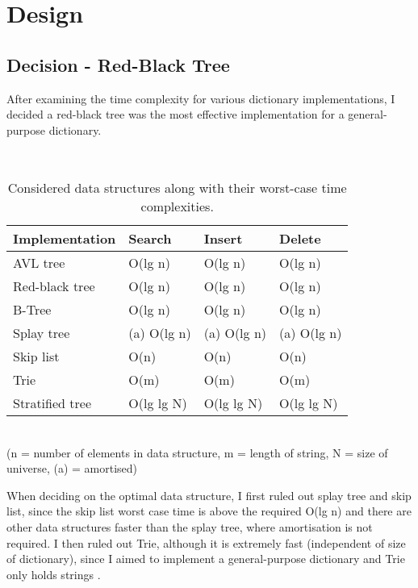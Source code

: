 \section{Design}

\subsection{Decision - Red-Black Tree}

After examining the time complexity for various dictionary implementations, I decided a red-black tree was the most effective implementation for a general-purpose dictionary.

\\

\begin{table}[hp]
\centering
\begin{tabular}{| l | l | l | l |}
\hline
\textbf{Implementation} & \textbf{Search} & \textbf{Insert} & \textbf{Delete} \\ \hline
AVL tree & O(lg n) & O(lg n) & O(lg n) \\ \hline
Red-black tree & O(lg n) & O(lg n) & O(lg n) \\ \hline
B-Tree & O(lg n) & O(lg n) & O(lg n) \\ \hline
Splay tree & (a) O(lg n) & (a) O(lg n) & (a) O(lg n) \\ \hline
Skip list & O(n) & O(n) & O(n) \\ \hline
Trie & O(m) & O(m) & O(m) \\ \hline
Stratified tree & O(lg lg N) & O(lg lg N) & O(lg lg N) \\ \hline
\end{tabular}
\\{\tiny{(n = number of elements in data structure, m = length of string, N = size of universe, (a) = amortised)}}\\
\caption{Considered data structures along with their worst-case time complexities.}
\end{table}

When deciding on the optimal data structure, I first ruled out splay tree and skip list, since the skip list worst case time is above the required O(lg n) and there are other data structures faster than the splay tree, where amortisation is not required. I then ruled out Trie, although it is extremely fast (independent of size of dictionary), since I aimed to implement a general-purpose dictionary and Trie only holds strings \parencite{trie}.

